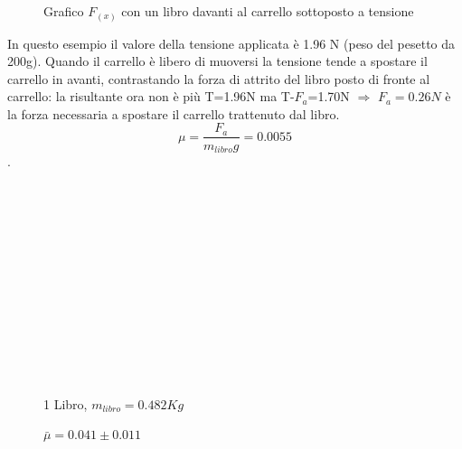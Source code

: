 \documentclass[a4paper]{article}
\theoremstyle{definition}
\begin{document}
\begin{figure}[!ht]
	\captionsetup{labelformat=empty}
	\caption{Grafico \(F_{(x)}\) con un libro davanti al carrello sottoposto a tensione}
	
\end{figure}
\noindent In questo esempio il valore della tensione applicata è 1.96 N (peso del pesetto da 200g). Quando il carrello è libero di muoversi la tensione tende a spostare il carrello in avanti, contrastando la forza di attrito del libro posto di fronte al carrello: la risultante ora non è più T=1.96N ma T-\(F_{a}\)=1.70N \(\Rightarrow\) \(F_{a} = 0.26N\) è la forza necessaria a spostare il carrello trattenuto dal libro.\\
\[\mu = \frac{F_{a}}{m_{libro}g} = 0.0055\]
.\\\\\\\\\\\\\\\\\\\\\\\\\\
\begin{figure}[!htbp]
	\captionsetup{labelformat=empty}
	\caption{1 Libro, \(m_{libro} = 0.482 Kg\)}
	\caption{\(\bar{\mu} = 0.041 \pm 0.011\)}
\end{figure}
\end{document}
